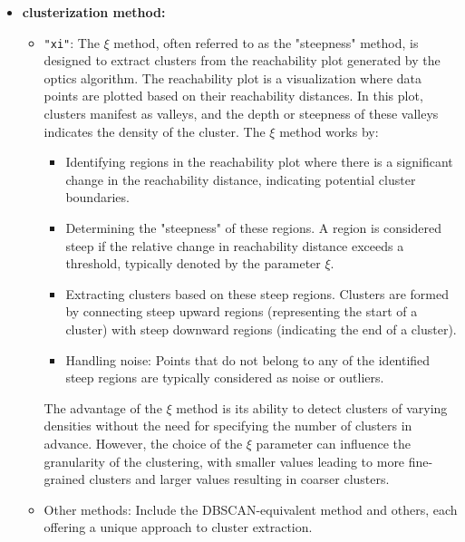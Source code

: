             \begin{itemize}
                \item \textbf{clusterization method:}
                \begin{itemize}
                    \item \texttt{"xi"}: The $\xi$ method, often referred to as the "steepness" method, is designed to extract clusters from the reachability plot generated by the \acrshort{optics} algorithm. The reachability plot is a visualization where data points are plotted based on their reachability distances. In this plot, clusters manifest as valleys, and the depth or steepness of these valleys indicates the density of the cluster. The $\xi$ method works by:

                    \begin{itemize}
                        \item Identifying regions in the reachability plot where there is a significant change in the reachability distance, indicating potential cluster boundaries.
                        
                        \item Determining the "steepness" of these regions. A region is considered steep if the relative change in reachability distance exceeds a threshold, typically denoted by the parameter $\xi$. 
                        
                        \item Extracting clusters based on these steep regions. Clusters are formed by connecting steep upward regions (representing the start of a cluster) with steep downward regions (indicating the end of a cluster).
                        
                        \item Handling noise: Points that do not belong to any of the identified steep regions are typically considered as noise or outliers.
                    \end{itemize}
                    
                    The advantage of the $\xi$ method is its ability to detect clusters of varying densities without the need for specifying the number of clusters in advance. However, the choice of the $\xi$ parameter can influence the granularity of the clustering, with smaller values leading to more fine-grained clusters and larger values resulting in coarser clusters.

                    \item Other methods: Include the DBSCAN-equivalent method and others, each offering a unique approach to cluster extraction.
                \end{itemize}
                

\end{itemize}
